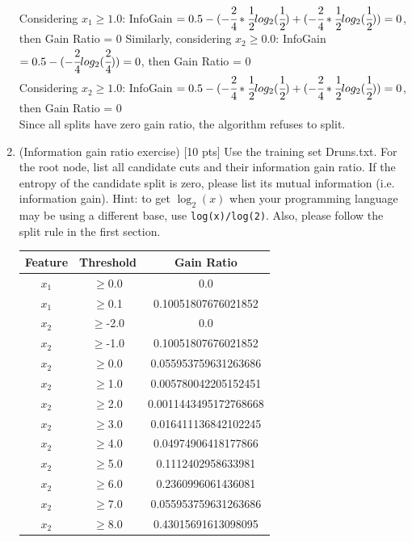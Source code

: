 \documentclass[a4paper]{article}
\theoremstyle{definition}
\newenvironment{soln}{
    \leavevmode\color{blue}\ignorespaces
}{}
\begin{document}
\begin{enumerate}
\begin{soln}
Considering $x_1 \geq 1.0$: InfoGain $= 0.5 - (-\cfrac{2}{4} * \cfrac{1}{2}log_2(\cfrac{1}{2}) + (-\cfrac{2}{4} * \cfrac{1}{2}log_2(\cfrac{1}{2})) = 0 $, then Gain Ratio = 0 
Similarly, considering $x_2 \geq 0.0$: InfoGain $= 0.5 - (-\cfrac{2}{4}log_2(\cfrac{2}{4})) = 0 $, then Gain Ratio = 0  \\
Considering $x_2 \geq 1.0$: InfoGain $= 0.5 - (-\cfrac{2}{4} * \cfrac{1}{2}log_2(\cfrac{1}{2}) + (-\cfrac{2}{4} * \cfrac{1}{2}log_2(\cfrac{1}{2})) = 0 $, then Gain Ratio = 0 \\
Since all splits have zero gain ratio, the algorithm refuses to split.
\end{soln}

\item (Information gain ratio exercise)  [10 pts] Use the training set Druns.txt.  For the root node, list all candidate cuts and their information gain ratio. If the entropy of the candidate split is zero, please list its mutual information (i.e. information gain). Hint: to get $\log_2(x)$ when your programming language may be using a different base, use \verb|log(x)/log(2)|. Also, please follow the split rule in the first section. \\
\begin{soln}
\begin{center}
\begin{tabular}{ |c| c |c| }
    \hline Feature & Threshold & Gain Ratio \\
    \hline $x_1$ & $\geq$0.0 & 0.0 \\
    \hline $x_1$ & $\geq$0.1 & 0.10051807676021852 \\
    \hline $x_2$ & $\geq$-2.0 & 0.0 \\
    \hline $x_2$ & $\geq$-1.0 & 0.10051807676021852 \\
    \hline $x_2$ & $\geq$0.0 & 0.055953759631263686 \\
    \hline $x_2$ & $\geq$1.0 & 0.005780042205152451 \\
    \hline $x_2$ & $\geq$2.0 & 0.0011443495172768668 \\
    \hline $x_2$ & $\geq$3.0 & 0.016411136842102245 \\
    \hline $x_2$ & $\geq$4.0 & 0.04974906418177866 \\
    \hline $x_2$ & $\geq$5.0 & 0.1112402958633981 \\
    \hline $x_2$ & $\geq$6.0 & 0.2360996061436081 \\
    \hline $x_2$ & $\geq$7.0 & 0.055953759631263686 \\
    \hline $x_2$ & $\geq$8.0 & 0.43015691613098095 \\
    \hline
\end{tabular}
\end{center}
\end{soln}


\end{enumerate}
\end{document}
